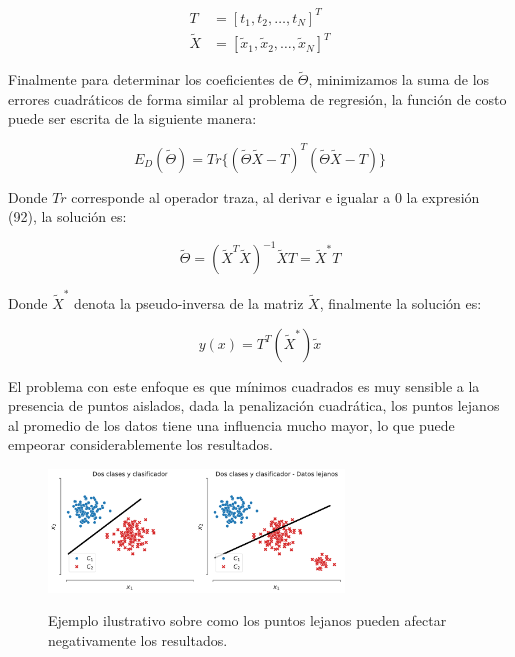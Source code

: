 \begin{align}
    T &= [t_1, t_2,\ldots, t_N]^T\\
    \tilde{X} &= [\tilde{x}_1, \tilde{x}_2, \ldots, \tilde{x}_N ]^T
\end{align}

Finalmente para determinar los coeficientes de $\tilde{\Theta}$, minimizamos la suma de los errores cuadráticos de forma similar al problema de regresión, la función de costo puede ser escrita de la siguiente manera:

\begin{equation}
    E_D(\tilde{\Theta}) = Tr\{(\tilde{\Theta}\tilde{X}-T)^T(\tilde{\Theta}\tilde{X}-T)\}
\end{equation}

Donde $Tr$ corresponde al operador traza, al derivar e igualar a 0 la expresión (92), la solución es:

\begin{equation}
    \tilde{\Theta} = (\tilde{X}^T\tilde{X})^{-1}\tilde{X}T = \tilde{X}^*T
\end{equation}

Donde $\tilde{X}^*$ denota la pseudo-inversa de la matriz $\tilde{X}$, finalmente la solución es:

\begin{equation}
y(x) = T^T(\tilde{X}^*)\tilde{x}
\end{equation}

El problema con este enfoque es que mínimos cuadrados es muy sensible a la presencia de puntos aislados, dada la penalización cuadrática, los puntos lejanos al promedio de los datos tiene una influencia mucho mayor, lo que puede empeorar considerablemente los resultados.


\begin{figure}[H]
    \centering
    \includegraphics[width=0.7\textwidth]{img/cap2_dosclases_clasificador.pdf}\\
    \caption{Ejemplo ilustrativo sobre como los puntos lejanos pueden afectar negativamente los resultados.}
    \label{fig:clasif_mse}
\end{figure}

